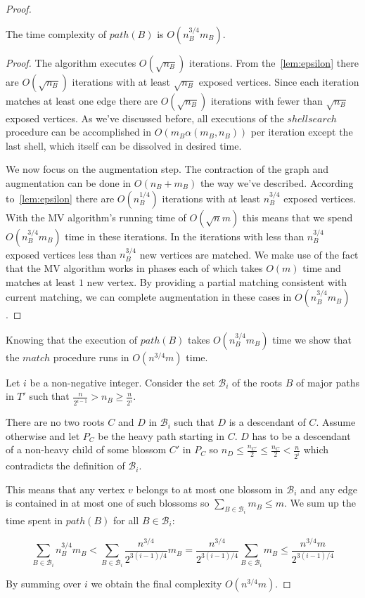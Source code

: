 \begin{proof}
\begin{lemma}\label{lem:pathcompl}
    The time complexity of $path(B)$ is $O(n_B^{3/4}m_B)$.
\end{lemma}

\begin{proof}
    The algorithm executes $O(\sqrt{n_B})$ iterations. From the~\ref{lem:epsilon} there are $O(\sqrt{n_B})$ iterations with at least $\sqrt{n_B}$ exposed vertices. Since each iteration matches at least one edge there are $O(\sqrt{n_B})$ iterations with fewer than $\sqrt{n_B}$ exposed vertices. As we've discussed before, all executions of the $shellsearch$ procedure can be accomplished in $O(m_B \alpha(m_B, n_B))$ per iteration except the last shell, which itself can be dissolved in desired time.

    We now focus on the augmentation step. The contraction of the graph and augmentation can be done in $O(n_B + m_B)$ the way we've described. According to~\ref{lem:epsilon} there are $O(n_B^{1/4})$ iterations with at least $n_B^{3/4}$ exposed vertices. With the MV algorithm's running time of $O(\sqrt{n}m)$ this means that we spend $O(n_B^{3/4}m_B)$ time in these iterations. In the iterations with less than $n_B^{3/4}$ exposed vertices less than $n_B^{3/4}$ new vertices are matched. We make use of the fact that the MV algorithm works in phases each of which takes $O(m)$ time and matches at least $1$ new vertex. By providing a partial matching consistent with current matching, we can complete augmentation in these cases in $O(n_B^{3/4}m_B)$.
\end{proof}

Knowing that the execution of $path(B)$ takes $O(n_B^{3/4}m_B)$ time we show that the $match$ procedure runs in $O(n^{3/4}m)$ time.

Let $i$ be a non-negative integer. Consider the set $\mathcal{B}_i$ of the roots $B$ of major paths in $T'$ such that $\frac{n}{2^{i-1}} > n_B \geq \frac{n}{2^i}$. 

There are no two roots $C$ and $D$ in $\mathcal{B}_i$ such that $D$ is a descendant of $C$. Assume otherwise and let $P_C$ be the heavy path starting in $C$. $D$ has to be a descendant of a non-heavy child of some blossom $C'$ in $P_C$ so $n_D \leq \frac{n_{C'}}{2} \leq \frac{n_C}{2} < \frac{n}{2^i}$ which contradicts the definition of $\mathcal{B}_i$. 

This means that any vertex $v$ belongs to at most one blossom in $\mathcal{B}_i$ and any edge is contained in at most one of such blossoms so $\sum_{B \in \mathcal{B}_i} m_B \leq m$. We sum up the time spent in $path(B)$ for all $B \in \mathcal{B}_i$:


\[\sum_{B \in \mathcal{B}_i} n_B^{3/4}m_B < \sum_{B \in \mathcal{B}_i} \frac{n^{3/4}}{2^{3(i-1)/4}}m_B = \frac{n^{3/4}}{2^{3(i-1)/4}} \sum_{B \in \mathcal{B}_i} m_B \leq \frac{n^{3/4}m}{2^{3(i-1)/4}}\]

By summing over $i$ we obtain the final complexity $O(n^{3/4}m)$.

\end{proof}
